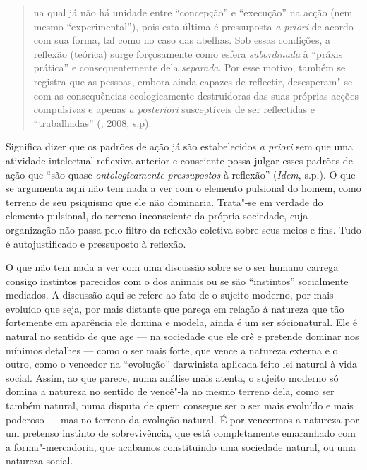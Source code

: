 \begin{quote}
na qual já não há unidade entre ``concepção'' e ``execução'' na acção
(nem mesmo ``experimental''), pois esta última é pressuposta \emph{a
priori} de acordo com sua forma, tal como no caso das abelhas. Sob essas
condições, a reflexão (teórica) surge forçosamente como esfera
\emph{subordinada} à ``práxis prática'' e consequentemente dela
\emph{separada}. Por esse motivo, também se registra que as pessoas,
embora ainda capazes de reflectir, desesperam"-se com as consequências
ecologicamente destruidoras das suas próprias acções compulsivas e
apenas \emph{a posteriori} susceptíveis de ser reflectidas e
``trabalhadas'' (, 2008, s.p).
\end{quote}

Significa dizer que os padrões de ação já são estabelecidos \emph{a
priori} sem que uma atividade intelectual reflexiva anterior e consciente
possa julgar esses padrões de ação que ``são quase \emph{ontologicamente
pressupostos} à reflexão'' (\emph{Idem}, s.p.). O que se argumenta aqui
não tem nada a ver com o elemento pulsional do homem, como terreno de
seu psiquismo que ele não dominaria. Trata"-se em verdade do elemento
pulsional, do terreno inconsciente da própria sociedade, cuja
organização não passa pelo filtro da reflexão coletiva sobre seus meios
e fins. Tudo é autojustificado e pressuposto à reflexão.

O que não tem nada a ver com uma discussão sobre se o ser humano carrega
consigo instintos parecidos com o dos animais ou se são ``instintos''
socialmente mediados. A discussão aqui se refere ao fato de o sujeito
moderno, por mais evoluído que seja, por mais distante que pareça em
relação à natureza que tão fortemente em aparência ele domina e modela,
ainda é um ser sócionatural. Ele é natural no sentido de que age --- na
sociedade que ele crê e pretende dominar nos mínimos detalhes --- como o
ser mais forte, que vence a natureza externa e o outro, como o vencedor
na ``evolução'' darwinista aplicada feito lei natural à vida social.
Assim, ao que parece, numa análise mais atenta, o sujeito moderno só
domina a natureza no sentido de vencê"-la no mesmo terreno dela, como ser
também natural, numa disputa de quem consegue ser o ser mais evoluído e
mais poderoso --- mas no terreno da evolução natural. É por vencermos a
natureza por um pretenso instinto de sobrevivência, que está
completamente emaranhado com a forma"-mercadoria, que acabamos
constituindo uma sociedade natural, ou uma natureza social.

